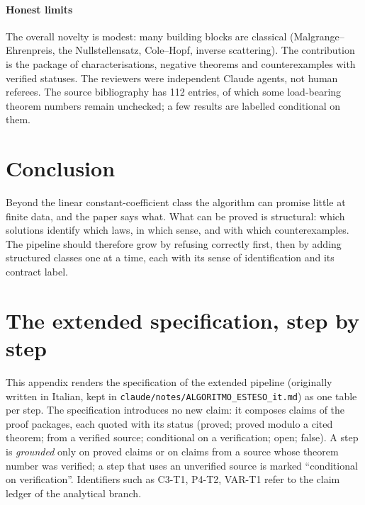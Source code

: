 \documentclass[11pt]{article}
\theoremstyle{plain}
\theoremstyle{definition}
\theoremstyle{remark}
\begin{document}
\paragraph{Honest limits} The overall novelty is modest: many building blocks are classical (Malgrange--Ehrenpreis, the Nullstellensatz, Cole--Hopf, inverse scattering). The contribution is the package of characterisations, negative theorems and counterexamples with verified statuses. The reviewers were independent Claude agents, not human referees.
The source bibliography has 112 entries, of which some load-bearing theorem numbers remain unchecked; a few results are labelled conditional on them.

\section{Conclusion}\label{sec:conclusion}
Beyond the linear constant-coefficient class the algorithm can promise little at finite data, and the paper says what. What can be proved is structural: which solutions identify which laws, in which sense, and with which counterexamples.
The pipeline should therefore grow by refusing correctly first, then by adding structured classes one at a time, each with its sense of identification and its contract label.

\appendix

\section{The extended specification, step by step}\label{app:spec}
This appendix renders the specification of the extended pipeline (originally written in Italian, kept in \texttt{claude/notes/ALGORITMO\_ESTESO\_it.md}) as one table per step. The specification introduces no new claim: it composes claims of the proof packages, each quoted with its status (proved; proved modulo a cited theorem; from a verified source; conditional on a verification; open; false).
A step is \emph{grounded} only on proved claims or on claims from a source whose theorem number was verified; a step that uses an unverified source is marked ``conditional on verification''. Identifiers such as C3-T1, P4-T2, VAR-T1 refer to the claim ledger of the analytical branch.
\end{document}
